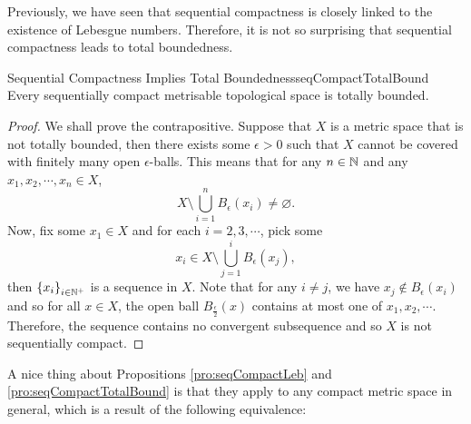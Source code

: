 \documentclass[math]{amznotes}
\theoremstyle{remark}
\begin{document}
Previously, we have seen that sequential compactness is closely linked to the existence of Lebesgue numbers. Therefore, it is not so surprising that sequential compactness leads to total boundedness.
\begin{probox}{Sequential Compactness Implies Total Boundedness}{seqCompactTotalBound}
    Every sequentially compact metrisable topological space is totally bounded.
    \tcblower
    \begin{proof}
        We shall prove the contrapositive. Suppose that $X$ is a metric space that is not totally bounded, then there exists some $\epsilon > 0$ such that $X$ cannot be covered with finitely many open $\epsilon$-balls. This means that for any $n \in \mathbb{N}$ and any $x_1, x_2, \cdots, x_n \in X$, 
        \begin{equation*}
            X \setminus \bigcup_{i = 1}^nB_{\epsilon}\left(x_i\right) \neq \varnothing.
        \end{equation*}
        Now, fix some $x_1 \in X$ and for each $i = 2, 3, \cdots$, pick some
        \begin{equation*}
            x_i \in X \setminus \bigcup_{j = 1}^iB_{\epsilon}\left(x_j\right),
        \end{equation*}
        then $\left\{x_i\right\}_{i \in \mathbb{N}^+}$ is a sequence in $X$. Note that for any $i \neq j$, we have $x_j \notin B_{\epsilon}\left(x_i\right)$ and so for all $x \in X$, the open ball $B_{\frac{\epsilon}{2}}\left(x\right)$ contains at most one of $x_1, x_2, \cdots$. Therefore, the sequence contains no convergent subsequence and so $X$ is not sequentially compact.
    \end{proof}
\end{probox}
A nice thing about Propositions \ref{pro:seqCompactLeb} and \ref{pro:seqCompactTotalBound} is that they apply to any compact metric space in general, which is a result of the following equivalence:
\end{document}
